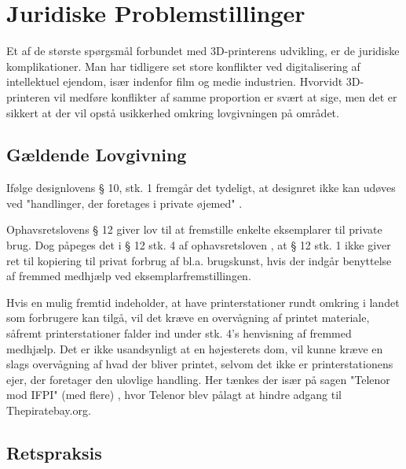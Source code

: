 

\section{Juridiske Problemstillinger}

Et af de største spørgsmål forbundet med 3D-printerens udvikling, er de juridiske komplikationer. Man har tidligere set store konflikter ved digitalisering af intellektuel ejendom, især indenfor film og medie industrien. Hvorvidt 3D-printeren vil medføre konflikter af samme proportion er svært at sige, men det er sikkert at der vil opstå usikkerhed omkring lovgivningen på området.

\subsection{Gældende Lovgivning}

Ifølge designlovens § 10, stk. 1 fremgår det tydeligt, at designret ikke kan udøves ved "handlinger, der foretages i private øjemed" \autocite{retsinformation.dk_designloven_2012}.

Ophavsretslovens § 12 giver lov til at fremstille enkelte eksemplarer til private brug.
Dog påpeges det i § 12 stk. 4 af ophavsretsloven \autocite{retsinformation.dk_ophavsretsloven_2010}, at § 12 stk. 1 ikke giver ret til kopiering til privat forbrug af bl.a. brugskunst, hvis der indgår benyttelse af fremmed medhjælp ved eksemplarfremstillingen.


Hvis en mulig fremtid indeholder, at have printerstationer rundt omkring i landet \autocite{bjorn_godske_dansk_2012} som forbrugere kan tilgå, vil det kræve en overvågning af printet materiale, såfremt printerstationer falder ind under stk. 4's henvisning af fremmed medhjælp. Det er ikke usandsynligt at en højesterets dom, vil kunne kræve en slags overvågning af hvad der bliver printet, selvom det ikke er printerstationens ejer, der foretager den ulovlige handling. Her tænkes der især på sagen "Telenor mod IFPI" (med flere) \autocite{domstol.dk_telenor_2010}, hvor Telenor blev pålagt at hindre adgang til Thepiratebay.org.

\subsection{Retspraksis}

